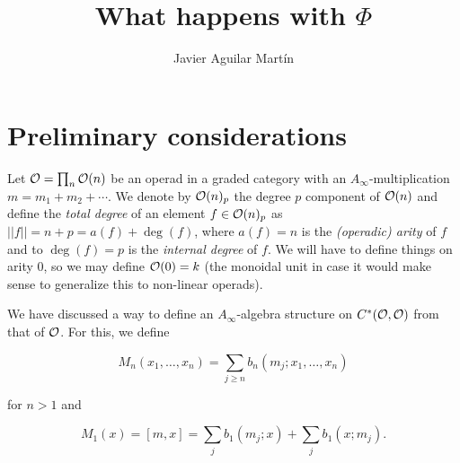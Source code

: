\documentclass[twoside]{article}
\begin{document}
\title{What happens with $\Phi$}
\author{Javier Aguilar Martín}
\maketitle

\section{Preliminary considerations}

Let $\mathcal{O}=\prod_n{\mathcal O}(n)$ be an operad in a graded category with an $A_\infty$-multiplication $m=m_1+m_2+\cdots$. We denote by ${\mathcal O}(n)_p$ the degree $p$ component of ${\mathcal O}(n)$ and define the \emph{total degree} of an element $f\in {\mathcal O}(n)_p$ as $||f||=n+p=a(f)+\deg(f)$, where $a(f)=n$ is the \emph{(operadic) arity} of $f$ and to $\deg(f)=p$ is the \emph{internal degree} of $f$. We will have to define things on arity 0, so we may define ${\mathcal O}(0)=k$ (the monoidal unit in case it would make sense to generalize this to non-linear operads). 


We have discussed a way to define an $A_\infty$-algebra structure on $C^*({\mathcal O},{\mathcal O})$ from that of ${\mathcal O}$. For this, we define
 

$$M_n(x_1,\dots, x_n)=\sum_{j\geq n}b_n(m_j;x_1,\dots, x_n)$$

for $n>1$ and 

$$M_1(x)=[m,x]=\sum_j b_1(m_j;x)+\sum_jb_1(x;m_j).$$ 

\end{document}
